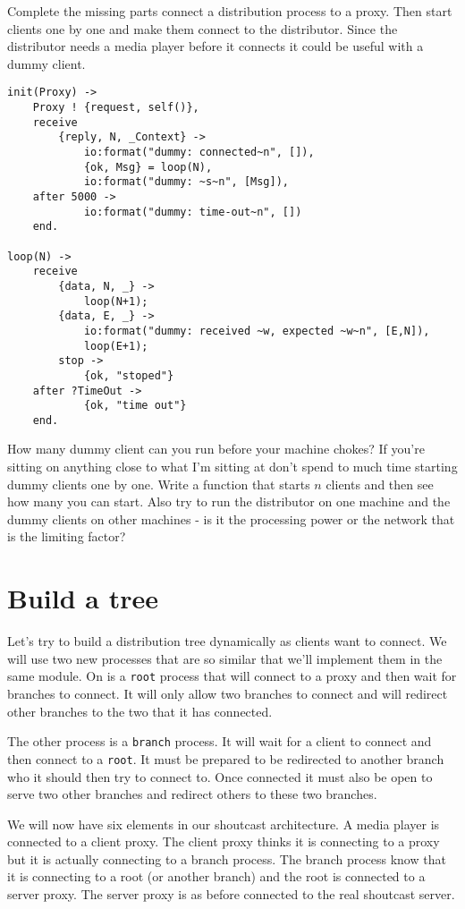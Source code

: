\documentclass[a4paper,11pt]{article}
\begin{document}
Complete the missing parts connect a distribution process to a
proxy. Then start clients one by one and make them connect to the
distributor. Since the distributor needs a media player before it
connects it could be useful with a dummy client.


\begin{verbatim}
init(Proxy) ->
    Proxy ! {request, self()},
    receive 
        {reply, N, _Context} ->
            io:format("dummy: connected~n", []),
            {ok, Msg} = loop(N),
            io:format("dummy: ~s~n", [Msg]),
    after 5000 ->
            io:format("dummy: time-out~n", [])
    end.

loop(N) ->
    receive 
        {data, N, _} ->
            loop(N+1);
        {data, E, _} ->
            io:format("dummy: received ~w, expected ~w~n", [E,N]),
            loop(E+1);
        stop ->
            {ok, "stoped"}
    after ?TimeOut ->
            {ok, "time out"}
    end.
\end{verbatim}


How many dummy client can you run before your machine chokes? If
you're sitting on anything close to what I'm sitting at don't spend to
much time starting dummy clients one by one. Write a function that
starts $n$ clients and then see how many you can start. Also try to
run the distributor on one machine and the dummy clients on other
machines - is it the processing power or the network that is the
limiting factor?

\section{Build a tree}

Let's try to build a distribution tree dynamically as clients want to
connect. We will use two new processes that are so similar that we'll
implement them in the same module. On is a {\tt root} process that
will connect to a proxy and then wait for branches to connect. It will
only allow two branches to connect and will redirect other branches to
the two that it has connected.

The other process is a {\tt branch} process. It will wait for a client
to connect and then connect to a {\tt root}. It must be prepared to be
redirected to another branch who it should then try to connect
to. Once connected it must also be open to serve two other branches
and redirect others to these two branches. 

We will now have six elements in our shoutcast architecture. A media
player is connected to a client proxy. The client proxy thinks it is
connecting to a proxy but it is actually connecting to a branch
process. The branch process know that it is connecting to a root (or
another branch) and the root is connected to a server proxy. The
server proxy is as before connected to the real shoutcast server.
\end{document}
